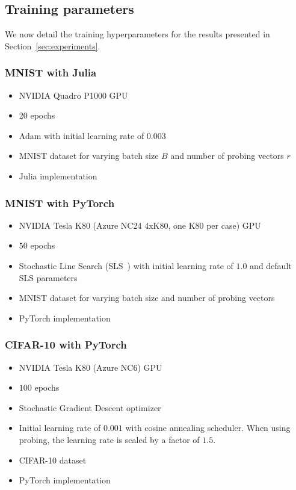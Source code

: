 \documentclass[10pt]{article}
\begin{document}
\subsection{Training parameters}\label{training-parameters}

We now detail the training hyperparameters for the results presented in Section~\ref{sec:experiments}.

\subsubsection{MNIST with Julia}

\begin{itemize}
\itemsep1pt\parskip0pt
\item
 NVIDIA Quadro P1000 GPU
\item
 20 epochs
\item
 Adam with initial learning rate of $0.003$
\item
 MNIST dataset for varying batch size $B$ and number of probing vectors $r$
\item
 Julia implementation
\end{itemize}

\subsubsection{MNIST with PyTorch}\label{mnist-with-pyxconv}

\begin{itemize}
\itemsep1pt\parskip0pt
\item
 NVIDIA Tesla K80 (Azure NC24 4xK80, one K80 per case) GPU
\item
 $50$ epochs
\item
 Stochastic Line Search (SLS~\citep{vaswani2019painless}) with initial learning rate of $1.0$ and default SLS parameters
\item
 MNIST dataset for varying batch size and number of probing vectors
\item PyTorch implementation
\end{itemize}

\subsubsection{CIFAR-10 with PyTorch}\label{cifar-hyper}

\begin{itemize}
\itemsep1pt\parskip0pt
\item
 NVIDIA Tesla K80 (Azure NC6) GPU
\item
 $100$ epochs
\item
 Stochastic Gradient Descent optimizer
\item Initial learning rate of $0.001$ with cosine annealing scheduler. When using probing, the learning rate is scaled by a factor of $1.5$.
\item
 CIFAR-10 dataset
\item PyTorch implementation
\end{itemize}
\end{document}
